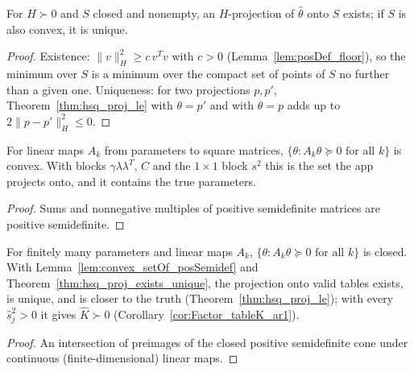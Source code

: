 \begin{theorem}\label{thm:hsq_proj_exists_unique}
  \leanok
  For $H \succ 0$ and $S$ closed and nonempty, an $H$-projection of
  $\hat\theta$ onto $S$ exists; if $S$ is also convex, it is unique.
\end{theorem}
\begin{proof}
  \leanok
  Existence: $\|v\|_H^2 \ge c\, v^Tv$ with $c > 0$
  (Lemma~\ref{lem:posDef_floor}), so the minimum over $S$ is a minimum over the
  compact set of points of $S$ no further than a given one. Uniqueness: for two
  projections $p, p'$, Theorem~\ref{thm:hsq_proj_le} with $\theta = p'$ and with
  $\theta = p$ adds up to $2\|p - p'\|_H^2 \le 0$.
\end{proof}

\begin{lemma}\label{lem:convex_setOf_posSemidef}
  \leanok
  For linear maps $A_k$ from parameters to square matrices,
  $\{\theta : A_k\theta \succeq 0 \text{ for all } k\}$ is convex. With blocks
  $\gamma\lambda\lambda^T$, $C$ and the $1\times 1$ block $s^2$ this is the set the
  app projects onto, and it contains the true parameters.
\end{lemma}
\begin{proof}
  \leanok
  Sums and nonnegative multiples of positive semidefinite matrices are
  positive semidefinite.
\end{proof}

\begin{lemma}\label{lem:isClosed_setOf_posSemidef}
  \leanok
  For finitely many parameters and linear maps $A_k$,
  $\{\theta : A_k\theta \succeq 0 \text{ for all } k\}$ is closed. With
  Lemma~\ref{lem:convex_setOf_posSemidef} and Theorem~\ref{thm:hsq_proj_exists_unique}, the
  projection onto valid tables exists, is unique, and is closer to the truth
  (Theorem~\ref{thm:hsq_proj_le}); with every $\hat s_j^2 > 0$ it gives
  $\hat K \succ 0$ (Corollary~\ref{cor:Factor_tableK_ar1}).
\end{lemma}
\begin{proof}
  \leanok
  An intersection of preimages of the closed positive semidefinite cone under continuous
  (finite-dimensional) linear maps.
\end{proof}

